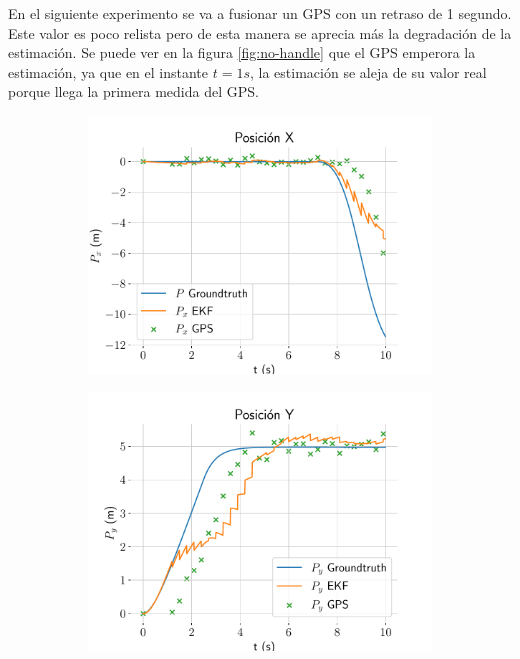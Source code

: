 En el siguiente experimento se va a fusionar un GPS con un retraso de 1 segundo. Este valor es poco relista pero de esta manera se aprecia más la degradación de la estimación. Se puede ver en la figura \ref{fig:no-handle} que el GPS emperora la estimación, ya que en el instante $t=1s$, la estimación se aleja de su valor real porque llega la primera medida del GPS. 
\begin{figure}	
	\centering
	\hspace*{-0.5cm}
	\begin{subfigure}[t]{0.49\textwidth}
		\centering
		\includegraphics[width=\textwidth]{estimador_px4/im_simu/no_handle_delay/x_t}
		\caption{}
		\label{fig:no-handle-xt}		
	\end{subfigure}
	\quad
	\begin{subfigure}[t]{0.49\textwidth}
		\centering
		\includegraphics[width=\textwidth]{estimador_px4/im_simu/no_handle_delay/y_t}

\end{subfigure}
\end{figure}
